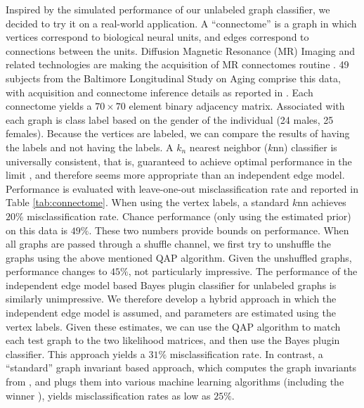 \documentclass[10pt,journal,cspaper,compsoc]{IEEEtran}
\begin{document}
Inspired by the simulated performance of our unlabeled graph classifier, we decided to try it on a real-world application.  A ``connectome'' is a graph in which vertices correspond to biological neural units, and edges correspond to connections between the units.  Diffusion Magnetic Resonance (MR) Imaging and related technologies are making the acquisition of MR connectomes routine \cite{Hagmann2010}.  49 subjects from the Baltimore Longitudinal Study on Aging comprise this data, with acquisition and connectome inference details as reported in \cite{Gray11}.  Each connectome yields a $70 \times 70$ element binary adjacency matrix.  Associated with each graph is class label based on the gender of the individual (24 males, 25 females).  Because the vertices are labeled, we can compare the results of having the labels and not having the labels.  A $k_n$ nearest neighbor ($k$nn) classifier is universally consistent, that is, guaranteed to achieve optimal performance in the limit \cite{Stone77}, and therefore seems more appropriate than an independent edge model.  Performance is evaluated with leave-one-out misclassification rate and reported in Table \ref{tab:connectome}. When using the vertex labels, a standard $k$nn achieves $20\%$ misclassification rate.  Chance performance (only using the estimated prior) on this data is $49\%$.  These two numbers provide bounds on performance.  When all graphs are passed through a shuffle channel, we first try to unshuffle the graphs using the above mentioned QAP algorithm.  Given the unshuffled graphs, performance changes to $45\%$, not particularly impressive.  The performance of the independent edge model based Bayes plugin classifier for unlabeled graphs is similarly unimpressive.  We therefore develop a hybrid approach in which the independent edge model is assumed, and parameters are estimated using the vertex labels.  Given these estimates, we can use the QAP algorithm to match each test graph to the two likelihood matrices, and then use the Bayes plugin classifier.  This approach yields a $31\%$ misclassification rate. In contrast, a ``standard'' graph invariant based approach, which computes the graph invariants from \cite{PCP11}, and plugs them into various machine learning algorithms (including the winner \cite{Dredze08}), yields misclassification rates as low as $25\%$. 
\end{document}
